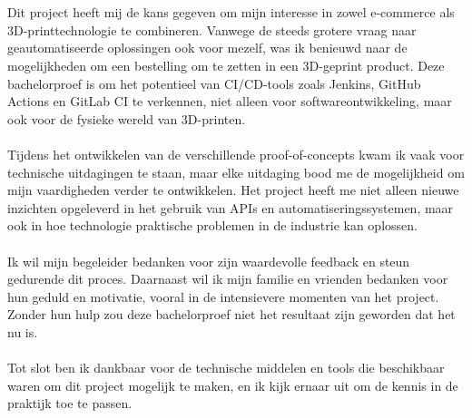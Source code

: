
\chapter*{}%
\label{ch:voorwoord}


Dit project heeft mij de kans gegeven om mijn interesse in zowel e-commerce als 3D-printtechnologie te combineren. Vanwege de steeds grotere vraag naar geautomatiseerde oplossingen ook voor mezelf, was ik benieuwd naar de mogelijkheden om een bestelling om te zetten in een 3D-geprint product. Deze bachelorproef is om het potentieel van CI/CD-tools zoals Jenkins, GitHub Actions en GitLab CI te verkennen, niet alleen voor softwareontwikkeling, maar ook voor de fysieke wereld van 3D-printen.
\\\\
Tijdens het ontwikkelen van de verschillende proof-of-concepts kwam ik vaak voor technische uitdagingen te staan, maar elke uitdaging bood me de mogelijkheid om mijn vaardigheden verder te ontwikkelen. Het project heeft me niet alleen nieuwe inzichten opgeleverd in het gebruik van APIs en automatiseringssystemen, maar ook in hoe technologie praktische problemen in de industrie kan oplossen.
\\\\
Ik wil mijn begeleider bedanken voor zijn waardevolle feedback en steun gedurende dit proces. Daarnaast wil ik mijn familie en vrienden bedanken voor hun geduld en motivatie, vooral in de intensievere momenten van het project. Zonder hun hulp zou deze bachelorproef niet het resultaat zijn geworden dat het nu is.
\\\\
Tot slot ben ik dankbaar voor de technische middelen en tools die beschikbaar waren om dit project mogelijk te maken, en ik kijk ernaar uit om de kennis in de praktijk toe te passen.

